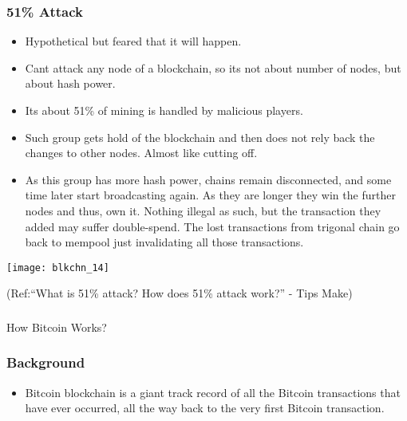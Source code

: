 \begin{frame}[fragile]\frametitle{51\% Attack}
\begin{itemize}
\item Hypothetical but feared that it will happen.
\item Cant attack any node of a blockchain, so its not about number of nodes, but about hash power.
\item Its about 51\% of mining is handled by malicious players. 
\item Such group gets hold of the blockchain and then does not rely back the changes to other nodes. Almost like cutting off.
\item As this group has more hash power, chains remain disconnected, and some time later start broadcasting again. As they are longer they win the further nodes and thus, own it. Nothing illegal as such, but the transaction they added may suffer double-spend. 
\itemn The lost transactions from trigonal chain go back to mempool just invalidating all those transactions.
\end{itemize}

\begin{center}
\texttt{[image: blkchn\_14]}

{\tiny (Ref:``What is 51\% attack? How does 51\% attack work?'' - Tips Make)}
\end{center}

\end{frame}



\begin{frame}[fragile]\frametitle{}
\begin{center}
{\Large How Bitcoin Works?}
\end{center}
\end{frame}

\begin{frame}[fragile]\frametitle{Background}
\begin{itemize}
\item Bitcoin blockchain is a giant track record of all the Bitcoin transactions that have ever occurred, all the way back to the very first Bitcoin transaction.
\end{itemize}


\end{frame}

